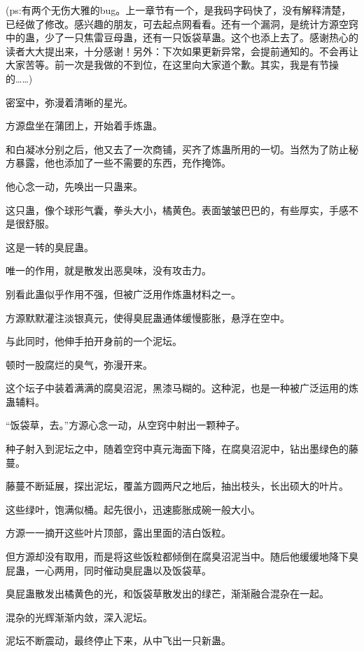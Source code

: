 
\begin{this_body}

(ps:有两个无伤大雅的bug。上一章节有一个，是我码字码快了，没有解释清楚，已经做了修改。感兴趣的朋友，可去起点网看看。还有一个漏洞，是统计方源空窍中的蛊，少了一只焦雷豆母蛊，还有一只饭袋草蛊。这个也添上去了。感谢热心的读者大大提出来，十分感谢！另外：下次如果更新异常，会提前通知的。不会再让大家苦等。前一次是我做的不到位，在这里向大家道个歉。其实，我是有节操的……)

密室中，弥漫着清晰的星光。

方源盘坐在蒲团上，开始着手炼蛊。

和白凝冰分别之后，他又去了一次商铺，买齐了炼蛊所用的一切。当然为了防止秘方暴露，他也添加了一些不需要的东西，充作掩饰。

他心念一动，先唤出一只蛊来。

这只蛊，像个球形气囊，拳头大小，橘黄色。表面皱皱巴巴的，有些厚实，手感不是很舒服。

这是一转的臭屁蛊。

唯一的作用，就是散发出恶臭味，没有攻击力。

别看此蛊似乎作用不强，但被广泛用作炼蛊材料之一。

方源默默灌注淡银真元，使得臭屁蛊通体缓慢膨胀，悬浮在空中。

与此同时，他伸手拍开身前的一个泥坛。

顿时一股腐烂的臭气，弥漫开来。

这个坛子中装着满满的腐臭沼泥，黑漆马糊的。这种泥，也是一种被广泛运用的炼蛊辅料。

“饭袋草，去。”方源心念一动，从空窍中射出一颗种子。

种子射入到泥坛之中，随着空窍中真元海面下降，在腐臭沼泥中，钻出墨绿色的藤蔓。

藤蔓不断延展，探出泥坛，覆盖方圆两尺之地后，抽出枝头，长出硕大的叶片。

这些绿叶，饱满似桶。起先很小，迅速膨胀成碗一般大小。

方源一一摘开这些叶片顶部，露出里面的洁白饭粒。

但方源却没有取用，而是将这些饭粒都倾倒在腐臭沼泥当中。随后他缓缓地降下臭屁蛊，一心两用，同时催动臭屁蛊以及饭袋草。

臭屁蛊散发出橘黄色的光，和饭袋草散发出的绿芒，渐渐融合混杂在一起。

混杂的光辉渐渐内敛，深入泥坛。

泥坛不断震动，最终停止下来，从中飞出一只新蛊。


\end{this_body}
